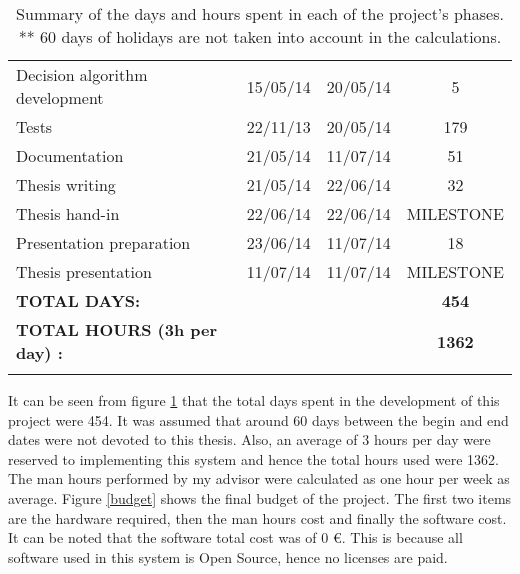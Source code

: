 \begin{appendices}
\begin{table}[H]
\begin{tabular} {l c c c }
\hspace*{0.5cm}	Decision algorithm development	&	15/05/14	&	20/05/14	&	5	\\
\hspace*{0.5cm}	Tests	&	22/11/13	&	20/05/14	&	179\\	
Documentation	&	21/05/14	&	11/07/14	&	51	\\
\hspace*{0.5cm}		Thesis writing	&	21/05/14	&	22/06/14	&	32	\\
\hspace*{0.5cm}		Thesis hand-in	&	22/06/14	&	22/06/14	&	MILESTONE	\\
\hspace*{0.5cm}		Presentation preparation		&	23/06/14	&	11/07/14	&	18	\\
\hspace*{0.5cm}		Thesis presentation		&	11/07/14	&	11/07/14	&	MILESTONE	\\

\addlinespace[3mm]
\bottomrule
\addlinespace[3mm]

\textbf{TOTAL DAYS: 	}		&&&\textbf{	454}	\\
\textbf{TOTAL HOURS (3h per day) :} &&&			\textbf{1362}	\\
\addlinespace[3mm]

\bottomrule
\end{tabular}
\caption[Days and hours per project phase]{Summary of the days and hours spent in each of the project's phases.\\
** 60 days of holidays are not taken into account in the calculations.}	
\label{phases}

\end{table}



		It can be seen from figure \ref{phases} that the total days spent in the development of this project were 454. 
		It was assumed that around 60 days between the begin and end dates were not devoted to this thesis. 
		Also, an average of 3 hours per day were reserved to implementing this system and hence the total hours used were 1362. 
		The man hours performed by my advisor were calculated as one hour per week as average. 
		Figure \ref{budget} shows the final budget of the project. 
		The first two items are the hardware required, then the man hours cost and finally the software cost. 
		It can be noted that the software total cost was of 0 \euro. 
		This is because all software used in this system is Open Source, hence no licenses are paid. 



\end{appendices}

